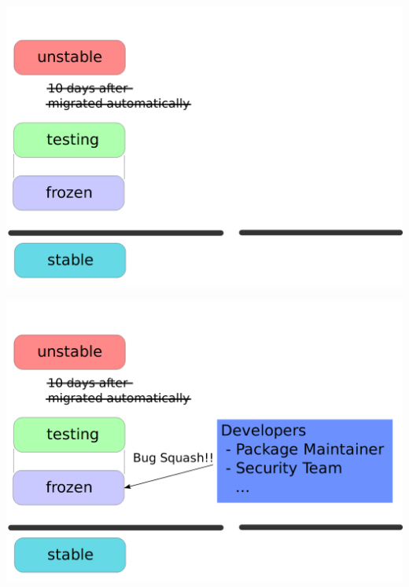 \documentclass[cjk,c,squeeze,shrink,dvipdfmx,12pt]{beamer}
\begin{document}
{%
  \begin{frame}
    \includegraphics[width=\paperwidth]{./image201011/Debian-Release-Cycle03.png}
  \end{frame}
}
{%
  \begin{frame}
    \includegraphics[width=\paperwidth]{./image201011/Debian-Release-Cycle04.png}
  \end{frame}
}
\end{document}
